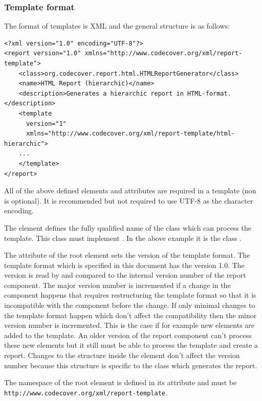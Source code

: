 \subsubsection{Template format} \label{Classes:Report:Template}

The format of templates is XML and the general structure is as follows:
\begin{verbatim}
<?xml version="1.0" encoding="UTF-8"?>
<report version="1.0" xmlns="http://www.codecover.org/xml/report-template">
    <class>org.codecover.report.html.HTMLReportGenerator</class>
    <name>HTML Report (hierarchic)</name>
    <description>Generates a hierarchic report in HTML-format.</description>
    <template
      version="1"
      xmlns="http://www.codecover.org/xml/report-template/html-hierarchic">
    ...
    </template>
</report>
\end{verbatim}
All of the above defined elements and attributes are required in a template (non is optional). It is recommended but not required to use UTF-8 as the character encoding.

The element  defines the fully qualified name of the class which can process the template. This class must implement . In the above example it is the class .

The attribute  of the root element  sets the version of the template format. The template format which is specified in this document has the version 1.0. The version is read by  and compared to the internal version number of the report component. The major version number is incremented if a change in the component happens that requires restructuring the template format so that it is incompatible with the component before the change. If only minimal changes to the template format happen which don't affect the compatibility then the minor version number is incremented. This is the case if for example new elements are added to the template. An older version of the report component can't process these new elements  but it still must be able to process the template and create a report. Changes to the structure inside the  element don't affect the version number because this structure is specific to the class which generates the report.

The namespace of the root element is defined in its attribute  and must be \texttt{http://www.codecover.org/xml/report-template}.

